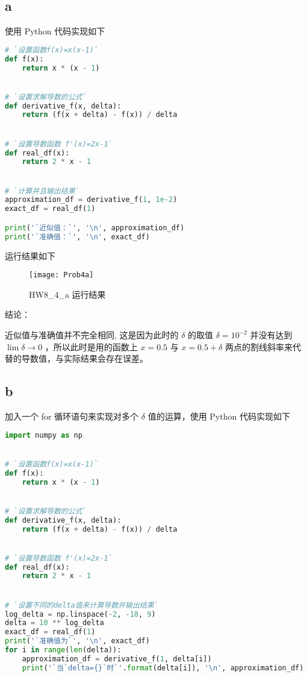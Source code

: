 \documentclass[UTF8]{ctexart}
\begin{document}
    \subsection{a}\label{subsec:4.1}
    使用 Python 代码实现如下
    \begin{lstlisting}[language=Python, breaklines = true,label={lst:lstlisting4.1}]
# `设置函数f(x)=x(x-1)`
def f(x):
    return x * (x - 1)


# `设置求解导数的公式`
def derivative_f(x, delta):
    return (f(x + delta) - f(x)) / delta


# `设置导数函数 f'(x)=2x-1`
def real_df(x):
    return 2 * x - 1


# `计算并且输出结果`
approximation_df = derivative_f(1, 1e-2)
exact_df = real_df(1)

print('`近似值：`', '\n', approximation_df)
print('`准确值：`', '\n', exact_df)
    \end{lstlisting}

    运行结果如下
    \begin{figure}[h]
        \centering
        \texttt{[image: Prob4a]}
        \caption{HW8\_4\_a 运行结果}\label{fig:figure4.1}
    \end{figure}

    结论：

    近似值与准确值并不完全相同, 这是因为此时的 \(\delta\) 的取值 \(\delta = 10^{-2}\) 并没有达到 \(\lim{\delta \rightarrow 0}\) ，所以此时是用的函数上 \(x = 0.5\) 与 \(x = 0.5 + \delta\) 两点的割线斜率来代替的导数值，与实际结果会存在误差。

    \subsection{b}\label{subsec:4.2}
    加入一个 for 循环语句来实现对多个 \(\delta\) 值的运算，使用 Python 代码实现如下
    \begin{lstlisting}[language=Python, breaklines = true,label={lst:lstlisting4.2}]
import numpy as np


# `设置函数f(x)=x(x-1)`
def f(x):
    return x * (x - 1)


# `设置求解导数的公式`
def derivative_f(x, delta):
    return (f(x + delta) - f(x)) / delta


# `设置导数函数 f'(x)=2x-1`
def real_df(x):
    return 2 * x - 1


# `设置不同的delta值来计算导数并输出结果`
log_delta = np.linspace(-2, -18, 9)
delta = 10 ** log_delta
exact_df = real_df(1)
print('`准确值为`', '\n', exact_df)
for i in range(len(delta)):
    approximation_df = derivative_f(1, delta[i])
    print('`当`delta={}`时`'.format(delta[i]), '\n', approximation_df)
    \end{lstlisting}
\end{document}
